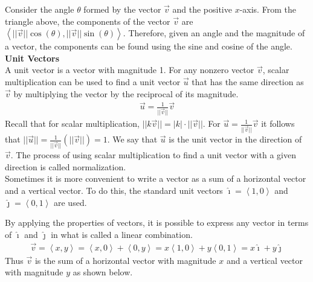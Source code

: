 \documentclass[a4paper]{article}
\let\bf\textbf
\newcommand{\la}{\left\langle}
\newcommand{\ra}{\right\rangle}
\newcommand{\ih}{\hat{\imath}}
\newcommand{\jh}{\hat{\jmath}}
\begin{document}
Consider the angle $\theta$ formed by the vector $\vec{v}$ and the positive $x$-axis. From the triangle above, the components of the vector $\vec{v}$ are $\la ||\vec{v}||\cos(\theta),||\vec{v}||\sin(\theta) \ra$. Therefore, given an angle and the magnitude of a vector, the components can be found using the sine and cosine of the angle.
\vspace{2mm}\\
\bf{Unit Vectors}
\vspace{2mm}\\
A unit vector is a vector with magnitude 1. For any nonzero vector $\vec{v}$, scalar multiplication can be used to find a unit vector $\vec{u}$ that has the same direction as $\vec{v}$ by multiplying the vector by the reciprocal of its magnitude.
\begin{align*}
    \vec{u} = \frac{1}{||\vec{v}||}\vec{v}
\end{align*} 
Recall that for scalar multiplication, $||k\vec{v}|| = |k| \cdot ||\vec{v}||$. For $\vec{u} = \frac{1}{||\vec{v}||}\vec{v}$ it follows that $||\vec{u}|| = \frac{1}{||\vec{v}||}(||\vec{v}||) = 1$. We say that $\vec{u}$ is the unit vector in the direction of $\vec{v}$. The process of using scalar multiplication to find a unit vector with a given direction is called normalization.
\vspace{1mm}\\
Sometimes it is more convenient to write a vector as a sum of a horizontal vector and a vertical vector. To do this, the standard unit vectors $\ih = \la 1, 0 \ra$ and $\jh = \la 0, 1 \ra$ are used.
\begin{center}
\end{center}
By applying the properties of vectors, it is possible to express any vector in terms of $\ih$ and $\jh$ in what is called a linear combination.
\begin{align*}
    \vec{v} = \la x, y \ra = \la x, 0 \ra + \la 0, y \ra = x\la 1, 0 \ra + y\la 0, 1 \ra = x\ih + y\jh
\end{align*}
Thus $\vec{v}$ is the sum of a horizontal vector with magnitude $x$ and a vertical vector with magnitude $y$ as shown below.
\begin{center}
\end{center}
\end{document}
